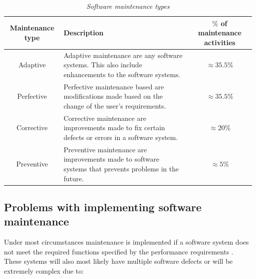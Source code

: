 \begin{table}[!htb]
	\centering
	\small
	\caption[Software maintenance types]
	{\textit{Software maintenance types}}
	\label{tbl:CH1_MaintenanceTypes}
	\begin{tabularx}{\textwidth}{|c|X|c|}
		\hline
		\textbf{Maintenance type} & \textbf{Description} & \textbf{$\%$ of maintenance activities} \\ \hline
		Adaptive & \raggedright Adaptive maintenance are any software systems. This also include enhancements to the software systems. & $\approx 35.5\%$ \\ \hline
		Perfective & Perfective maintenance based are modifications made based on the change of the user's requirements. & $\approx 35.5\%$ \\ \hline
		Corrective & \raggedright Corrective maintenance are improvements made to fix certain defects or errors in a software system. & $\approx 20\%$ \\ \hline
		Preventive & \raggedright  Preventive maintenance are improvements made to software systems that prevents problems in the future. & $\approx 5\%$ \\ \hline
	\end{tabularx}
\end{table}

\subsection{Problems with implementing software maintenance}\label{sec:Maintenance_problems}

Under most circumstances maintenance is implemented if a software system does not meet the required functions specified by the performance requirements \cite{Ogheneovo2014, Sneed2004}. These systems will also most likely have multiple software defects or will be extremely complex due to:

